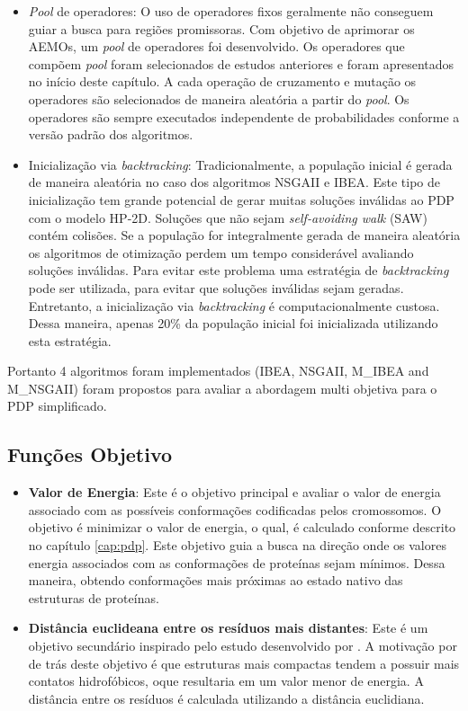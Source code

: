  
 \begin{itemize}
 		
		\item \textit{Pool} de operadores: O uso de operadores fixos geralmente não conseguem guiar a busca para regiões promissoras. Com objetivo de aprimorar os AEMOs, um \textit{pool} de operadores foi desenvolvido. Os operadores que compõem \textit{pool} foram selecionados de estudos anteriores e foram apresentados no início deste capítulo. A cada operação de cruzamento e mutação os operadores são selecionados de maneira aleatória a partir do \textit{pool}. Os operadores são sempre executados independente de probabilidades conforme a versão padrão dos algoritmos. 
	
		
		\item Inicialização via \textit{backtracking}: Tradicionalmente, a população inicial é gerada de maneira aleatória no caso dos algoritmos NSGAII e IBEA. Este tipo de inicialização tem grande potencial de gerar muitas soluções inválidas ao PDP com o modelo HP-2D. Soluções que não sejam \textit{self-avoiding walk} (SAW) contém colisões. Se a população for integralmente gerada de maneira aleatória os algoritmos de otimização perdem um tempo considerável avaliando soluções inválidas. Para evitar este problema uma estratégia de \textit{backtracking} pode ser utilizada, para evitar que soluções inválidas sejam geradas. Entretanto, a inicialização via \textit{backtracking} é computacionalmente custosa. Dessa maneira, apenas 20\% da população inicial foi inicializada utilizando esta estratégia.

\end{itemize}

Portanto 4 algoritmos foram implementados (IBEA, NSGAII, M\_IBEA and M\_NSGAII) foram propostos para avaliar a abordagem multi objetiva para o PDP simplificado.


\subsection{Funções Objetivo}


\begin{itemize}
	\item \textbf{Valor de Energia}: Este é o objetivo principal e avaliar o valor de energia associado com as possíveis conformações codificadas pelos cromossomos. O objetivo é minimizar o valor de energia, o qual, é calculado conforme descrito no capítulo \ref{cap:pdp}. Este objetivo guia a busca na direção onde os valores energia associados com as conformações de proteínas sejam mínimos. Dessa maneira, obtendo conformações mais próximas ao estado nativo das estruturas de proteínas.

    \item \textbf{Distância euclideana entre os resíduos mais distantes}: Este é um objetivo secundário inspirado pelo estudo desenvolvido por \cite{gabriel2012algoritmos}. A motivação por de trás deste objetivo é que estruturas mais compactas tendem a possuir mais contatos hidrofóbicos, oque resultaria em um valor menor de energia. A distância entre os resíduos é calculada utilizando a distância euclidiana.
   
\end{itemize}

